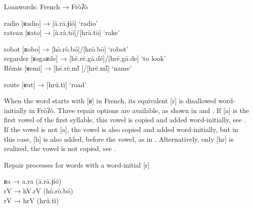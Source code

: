 \documentclass[output=paper]{langscibook}
\begin{document}
\begin{exe}
    \ex Loanwords: French → Fròʔò \label{ex:traore:41}\\
    \begin{xlist}
        \ex 
        \begin{xlist}
        \ex  radio             [ʁadio]         →         [ā.rā.ɉíó]                             ‘radio’\\
         \ex rateau           [ʁato]             →         [à.rà.tō]/[hrā.tō]                     ‘rake’ \\
         \end{xlist}
        \ex 
        \begin{xlist}
        \ex robot             [ʁobo]          →         [hò.rò.bó]/[hrō.bō]                ‘robot’  \\
        \ex regarder       [ʁəgaʁde]      →         [hē.rē.gā.dé]/[hrē.gā.de]        ‘to look’  \\
        \ex Rémis           [ʁemi]          →         [hē.rē.mĩ́ ]/[hrē.mĩ́]               ‘name’ \\
         \end{xlist}
        \ex 
        \begin{xlist}
         \ex route             [ʁut]            →         [hrú.tì]                                ‘road’   
         \end{xlist}
    \end{xlist}
\end{exe} 

When the word starts with [ʁ] in French, its equivalent [r] is disallowed word-initially in Fròʔò. Three repair options are available, as shown in  and . If [a] is the first vowel of the first syllable, this vowel is copied and added word-initially, see . If the vowel is not [a], the vowel is also copied and added word-initially, but in this case, [h] is also added, before the vowel, as in . Alternatively, only [hr] is realized, the vowel is not copied, see .

 \begin{exe}
     \ex Repair processes for words with a word-initial [r]\label{ex:traore:42}\\
        \begin{xlist}
            \ex ʁa   →  a.ra (ā.rā.ɉíó) \label{ex:traore:42a}\\
            \ex rV   →  hV.rV (hò.rò.bó)\label{ex:traore:42b}\\
            \ex rV   →  hrV (hrú.tì)\label{ex:traore:42c}\\
        \end{xlist}
 \end{exe}
\end{document}
